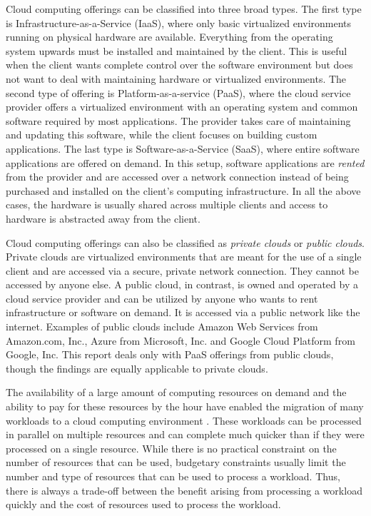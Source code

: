 \documentclass[12pt]{report}
\begin{document}
Cloud computing offerings can be classified into three broad types.
The first type is Infrastructure-as-a-Service (IaaS), where only basic virtualized environments running on physical hardware are available.
Everything from the operating system upwards must be installed and maintained by the client.
This is useful when the client wants complete control over the software environment but does not want to deal with maintaining hardware or virtualized environments.
The second type of offering is Platform-as-a-service (PaaS), where the cloud service provider offers a virtualized environment with an operating system and common software required by most applications.
The provider takes care of maintaining and updating this software, while the client focuses on building custom applications.
The last type is Software-as-a-Service (SaaS), where entire software applications are offered on demand.
In this setup, software applications are \textit{rented} from the provider and are accessed over a network connection instead of being purchased and installed on the client's computing infrastructure.
In all the above cases, the hardware is usually shared across multiple clients and access to hardware is abstracted away from the client.

Cloud computing offerings can also be classified as \textit{private clouds} or \textit{public clouds}.
Private clouds are virtualized environments that are meant for the use of a single client and are accessed via a secure, private network connection.
They cannot be accessed by anyone else.
A public cloud, in contrast, is owned and operated by a cloud service provider and can be utilized by anyone who wants to rent infrastructure or software on demand.
It is accessed via a public network like the internet.
Examples of public clouds include Amazon Web Services from Amazon.com, Inc., Azure from Microsoft, Inc. and Google Cloud Platform from Google, Inc.
This report deals only with PaaS offerings from public clouds, though the findings are equally applicable to private clouds.

The availability of a large amount of computing resources on demand and the ability to pay for these resources by the hour have enabled the migration of many workloads to a cloud computing environment \cite{RightScale:2015}.
These workloads can be processed in parallel on multiple resources and can complete much quicker than if they were processed on a single resource.
While there is no practical constraint on the number of resources that can be used, budgetary constraints usually limit the number and type of resources that can be used to process a workload.
Thus, there is always a trade-off between the benefit arising from processing a workload quickly and the cost of resources used to process the workload.
\end{document}
